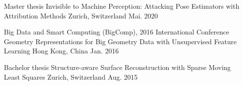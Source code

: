 

\begin{cventries}

  \cventry
    {Master thesis} %
    {Invisible to Machine Perception: Attacking Pose Estimators with Attribution Methods} %
    {Zurich, Switzerland} %
    {Mai. 2020} %
    {
      \begin{cvitems} %
      \end{cvitems}
    }

  \cventry
    {Big Data and Smart Computing (BigComp), 2016 International Conference} %
    {Geometry Representations for Big Geometry Data with Unsupervised Feature Learning} %
    {Hong Kong, China } %
    {Jan. 2016} %
    {
      \begin{cvitems} %
      \end{cvitems}
    }

  \cventry
    {Bachelor thesis} %
    {Structure-aware Surface Reconstruction with Sparse Moving Least Squares} %
    {Zurich, Switzerland} %
    {Aug. 2015} %
    {
      \begin{cvitems} %
      \end{cvitems}
    }

\end{cventries}
